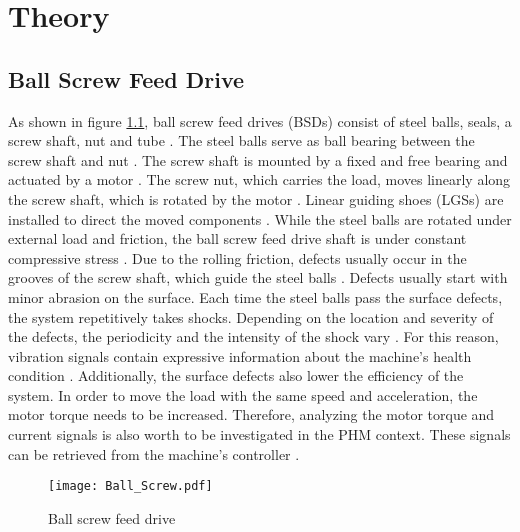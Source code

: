 \chapter{Theory}\label{chapter:theory}

\section{Ball Screw Feed Drive}
As shown in figure \ref{fig:Ball_Screw}, ball screw feed drives (BSDs) consist of steel balls, seals, a screw shaft, nut and tube \cite{Lee2015}. The steel balls serve as ball bearing between the screw shaft and nut \cite{Lee2015}. The screw shaft is mounted by a fixed and free bearing and actuated by a motor \cite{DENG2020}. The screw nut, which carries the load, moves linearly along the screw shaft, which is rotated by the motor \cite{Lee2015}. Linear guiding shoes (LGSs) are installed to direct the moved components \cite{DENG2020}. While the steel balls are rotated under external load and friction, the ball screw feed drive shaft is under constant compressive stress \cite{Lee2015}. Due to the rolling friction, defects usually occur in the grooves of the screw shaft, which guide the steel balls \cite{Lee2015}. Defects usually start with minor abrasion on the surface. Each time the steel balls pass the surface defects, the system repetitively takes shocks. Depending on the location and severity of the defects, the periodicity and the intensity of the shock vary \cite{Lee2015}. For this reason, vibration signals contain expressive information about the machine's health condition \cite{Lee2015}. Additionally, the surface defects also lower the efficiency of the system. In order to move the load with the same speed and acceleration, the motor torque needs to be increased. Therefore, analyzing the motor torque and current signals is also worth to be investigated in the PHM context. These signals can be retrieved from the machine's controller \cite{AZAMFAR2020103932}.

\begin{figure}[H]
  \centering
  \texttt{[image: Ball\_Screw.pdf]}
  \caption {Ball screw feed drive \cite{DENG2020}} \label{fig:Ball_Screw}
\end{figure}

